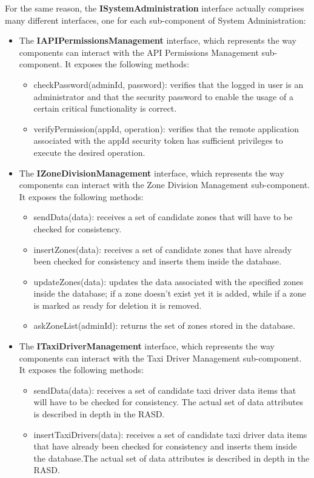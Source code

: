 For the same reason, the \textbf{ISystemAdministration} interface actually comprises many different interfaces, one for each sub-component of System Administration:
\begin{itemize}
	\item The \textbf{IAPIPermissionsManagement} interface, which represents the way components can interact with the API Permissions Management sub-component. It exposes the following methods:
	\begin{itemize}
	\item checkPassword(adminId, password): verifies that the logged in user is an administrator and that the security password to enable the usage of a certain critical functionality is correct.
	\item verifyPermission(appId, operation): verifies that the remote application associated with the appId security token has sufficient privileges to execute the desired operation.
	\end{itemize}
	\item The \textbf{IZoneDivisionManagement} interface, which represents the way components can interact with the Zone Division Management sub-component. It exposes the following methods:
	\begin{itemize}
	\item sendData(data): receives a set of candidate zones that will have to be checked for consistency.
	\item insertZones(data): receives a set of candidate zones that have already been checked for consistency and inserts them inside the database.
	\item updateZones(data): updates the data associated with the specified zones inside the database; if a zone doesn't exist yet it is added, while if a zone is marked as ready for deletion it is removed.
	\item askZoneList(adminId): returns the set of zones stored in the database. 
	\end{itemize}
	\item The \textbf{ITaxiDriverManagement} interface, which represents the way components can interact with the Taxi Driver Management sub-component. It exposes the following methods:
	\begin{itemize}
	\item sendData(data): receives a set of candidate taxi driver data items that will have to be checked for consistency. The actual set of data attributes is described in depth in the RASD.
	\item insertTaxiDrivers(data): receives a set of candidate taxi driver data items that have already been checked for consistency and inserts them inside the database.The actual set of data attributes is described in depth in the RASD.

\end{itemize}
\end{itemize}
